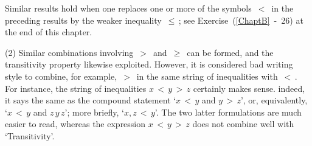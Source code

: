 {        Similar results hold when one replaces one or more of the symbols $\,<\,$ in the preceding results by the weaker inequality $\,{\leq}\,$; see Exercise~(\ref{ChaptB}~-~26) at the end of this chapter.

\V

        (2) Similar combinations involving $\,>\,$ and $\,{\geq}\,$ can be formed, and the transitivity property likewise exploited.
    However, it is considered bad writing style to combine, for example, $\,>\,$ in the same string of inequalities with $\,<\,$. For instance, the string of inequalities $x\,<\,y\,>\,z$ certainly makes sense.
    indeed, it says the same as the compound statement `$x\,<\,y$ and $y\,>\,z$', or,
    equivalently, `$x\,<\,y$ and $z\,y\,z$'; more briefly, `$x, z\,<\,y$'. The two latter formulations are much easier to read, whereas the expression $x\,<\,y\,>\,z$ does not combine well with `Transitivity'.

}%
